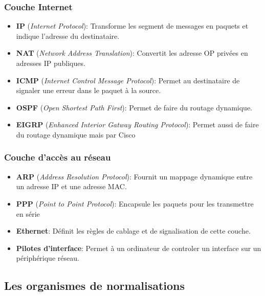  \subsubsection{Couche Internet}
 \begin{itemize}
	 \item \textbf{IP} (\textit{Internet Protocol}): Transforme les segment de messages en paquets et indique l'adresse du destinataire.
	 \item \textbf{NAT} (\textit{Network Address Translation}): Convertit les adresse OP privées en adresses IP publiques.
	 \item \textbf{ICMP} (\textit{Internet Control Message Protocol}): Permet au destinataire de signaler une erreur dans le paquet à la source.
	 \item \textbf{OSPF} (\textit{Open Shortest Path First}): Permet de faire du routage dynamique.
	 \item \textbf{EIGRP} (\textit{Enhanced Interior Gatway Routing Protocol}): Permet aussi de faire du routage dynamique mais par Cisco
 \end{itemize}

 \subsubsection{Couche d'accès au réseau}
 \begin{itemize}
	 \item \textbf{ARP} (\textit{Address Resolution Protocol}): Fournit un mappage dynamique entre un adresse IP et une adresse MAC\@.
	 \item \textbf{PPP} (\textit{Point to Point Protocol}): Encapsule les paquets pour les transmettre en série
	 \item \textbf{Ethernet}: Définit les règles de cablage et de signalisation de cette couche.
	 \item \textbf{Pilotes d'interface}: Permet à un ordinateur de controler un interface sur un périphérique réseau.
 \end{itemize}

 \subsection{Les organismes de normalisations}

